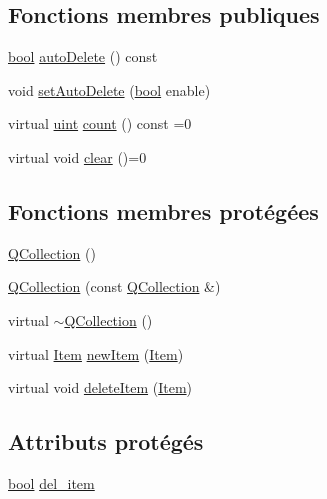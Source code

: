 \subsection*{Fonctions membres publiques}
\begin{DoxyCompactItemize}
\item 
\hyperlink{qglobal_8h_a1062901a7428fdd9c7f180f5e01ea056}{bool} \hyperlink{class_q_collection_a27d2028ae84b3ecedec5ad687bf75544}{auto\+Delete} () const 
\item 
void \hyperlink{class_q_collection_a6ed41913c76bfba54be6da26015ee3f3}{set\+Auto\+Delete} (\hyperlink{qglobal_8h_a1062901a7428fdd9c7f180f5e01ea056}{bool} enable)
\item 
virtual \hyperlink{qglobal_8h_a4d3943ddea65db7163a58e6c7e8df95a}{uint} \hyperlink{class_q_collection_a5886fc69a22cbb6fb5d462651a1c1d50}{count} () const  =0
\item 
virtual void \hyperlink{class_q_collection_a92416cc22907550389aad04c26be2f77}{clear} ()=0
\end{DoxyCompactItemize}
\subsection*{Fonctions membres protégées}
\begin{DoxyCompactItemize}
\item 
\hyperlink{class_q_collection_ab66048255d5340ef60bd8f4cc32d301d}{Q\+Collection} ()
\item 
\hyperlink{class_q_collection_a94f0f91325b3ac2ddad20c0e74dbd629}{Q\+Collection} (const \hyperlink{class_q_collection}{Q\+Collection} \&)
\item 
virtual \hyperlink{class_q_collection_af8783f52bdb06ce53cb8a86df70af159}{$\sim$\+Q\+Collection} ()
\item 
virtual \hyperlink{class_q_collection_ac6f3ddbf999e31fb797927f71ae6b5d7}{Item} \hyperlink{class_q_collection_a8a439f0c342ff1844a797fbea15b2283}{new\+Item} (\hyperlink{class_q_collection_ac6f3ddbf999e31fb797927f71ae6b5d7}{Item})
\item 
virtual void \hyperlink{class_q_collection_ab6c7cf56b681ba4fed6cf6a92494a410}{delete\+Item} (\hyperlink{class_q_collection_ac6f3ddbf999e31fb797927f71ae6b5d7}{Item})
\end{DoxyCompactItemize}
\subsection*{Attributs protégés}
\begin{DoxyCompactItemize}
\item 
\hyperlink{qglobal_8h_a1062901a7428fdd9c7f180f5e01ea056}{bool} \hyperlink{class_q_collection_a4774837390e8009788fb1124fd051d96}{del\+\_\+item}
\end{DoxyCompactItemize}


